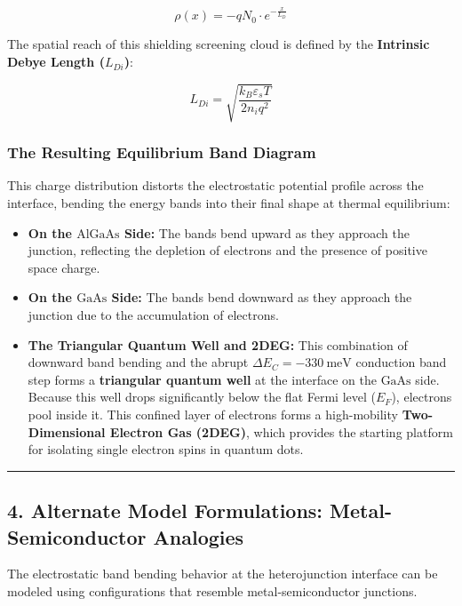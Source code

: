 \documentclass[
]{article}
\providecommand{\tightlist}{%
  \setlength{\itemsep}{0pt}\setlength{\parskip}{0pt}}
\begin{document}
\[\rho(x) = -qN_0 \cdot e^{-\frac{x}{L_D}}\]

The spatial reach of this shielding screening cloud is defined by the
\textbf{Intrinsic Debye Length (\(L_{Di}\))}:

\[L_{Di} = \sqrt{\frac{k_B \varepsilon_s T}{2n_i q^2}}\]

\subsubsection{The Resulting Equilibrium Band
Diagram}\label{the-resulting-equilibrium-band-diagram}

This charge distribution distorts the electrostatic potential profile
across the interface, bending the energy bands into their final shape at
thermal equilibrium:

\begin{itemize}
\tightlist
\item
  \textbf{On the \(\text{AlGaAs}\) Side:} The bands bend upward as they
  approach the junction, reflecting the depletion of electrons and the
  presence of positive space charge.
\item
  \textbf{On the \(\text{GaAs}\) Side:} The bands bend downward as they
  approach the junction due to the accumulation of electrons.
\item
  \textbf{The Triangular Quantum Well and 2DEG:} This combination of
  downward band bending and the abrupt \(\Delta E_C = -330\ \text{meV}\)
  conduction band step forms a \textbf{triangular quantum well} at the
  interface on the \(\text{GaAs}\) side. Because this well drops
  significantly below the flat Fermi level (\(E_F\)), electrons pool
  inside it. This confined layer of electrons forms a high-mobility
  \textbf{Two-Dimensional Electron Gas (2DEG)}, which provides the
  starting platform for isolating single electron spins in quantum dots.
\end{itemize}

\begin{center}\rule{0.5\linewidth}{0.5pt}\end{center}

\subsection{4. Alternate Model Formulations: Metal-Semiconductor
Analogies}\label{alternate-model-formulations-metal-semiconductor-analogies}

The electrostatic band bending behavior at the heterojunction interface
can be modeled using configurations that resemble metal-semiconductor
junctions.
\end{document}
